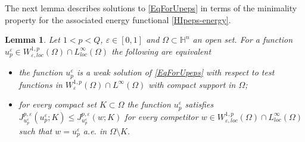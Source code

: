 \documentclass[10pt]{amsart}
\numberwithin{equation}{section}
\newtheorem{lemma}[theorem]{Lemma}
\theoremstyle{definition}
\newcommand{\He}{\mathbb{H}}
\begin{document}
The next lemma describes solutions to \eqref{EqForUpeps} in terms of the minimality property for the associated energy functional \eqref{HIpeps-energy}.

\begin{lemma}
\label{equa-vs-min}
Let $1<p<Q$, $\varepsilon \in [0,1]$ and $\Omega \subset \He^n$ an open set. For a function $ u^\varepsilon_p \in W^{1,p}_{\varepsilon, loc} (\Omega) \cap L^\infty_{loc}(\Omega)$ the following are equivalent
\begin{itemize}
\item[(i)] the function $u^{\varepsilon}_{p}$ is a weak solution of \eqref{EqForUpeps} with respect to test functions in $W^{1,p}_\varepsilon (\Omega)\cap L^\infty(\Omega)$ with compact support in $\Omega$;
\item[(ii)] for every compact set $K \subset \Omega$ the function $u^{\varepsilon}_{p}$ satisfies $
J_{u_p^{\varepsilon}}^{p,\varepsilon}(u_p^{\varepsilon};K) \leq J_{u_p^{\varepsilon}}^{p,\varepsilon}(w;K)$ for every competitor $w \in W^{1,p}_{\varepsilon, loc} (\Omega) \cap L^\infty_{loc}(\Omega)$ such that $w= u_{p}^{\varepsilon}$ a.e. in $\Omega \setminus K$.



\end{itemize}
\end{lemma}
\end{document}
